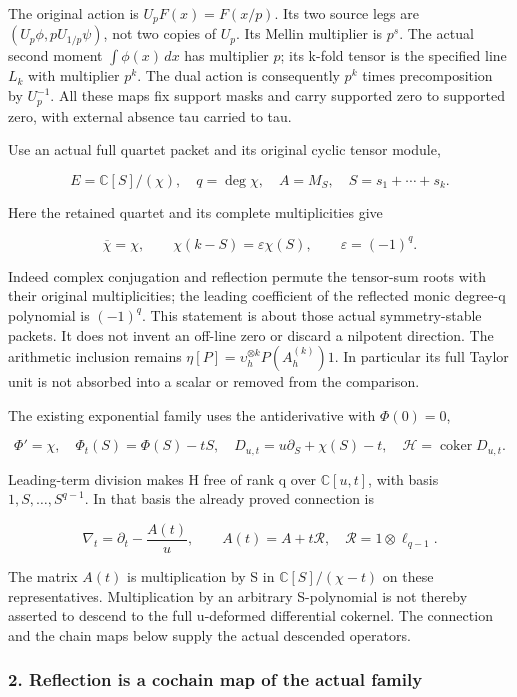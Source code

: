 \documentclass{article}
\begin{document}
The original action is \(U_p F(x)=F(x/p)\). Its two source legs are \((U_p\phi,pU_{1/p}\psi)\), not two copies of \(U_p\). Its Mellin multiplier is \(p^s\). The actual second moment \(\int\phi(x)\,dx\) has multiplier \(p\); its k-fold tensor is the specified line \(L_k\) with multiplier \(p^k\). The dual action is consequently \(p^k\) times precomposition by \(U_p^{-1}\). All these maps fix support masks and carry supported zero to supported zero, with external absence tau carried to tau.

Use an actual full quartet packet and its original cyclic tensor module,

\[
E=\mathbb C[S]/(\chi),\quad q=\deg\chi,\quad A=M_S,
\quad S=s_1+\cdots+s_k.
\tag{RW2}
\]

Here the retained quartet and its complete multiplicities give

\[
\overline\chi=\chi,\qquad
\chi(k-S)=\varepsilon\chi(S),\qquad\varepsilon=(-1)^q.
\tag{RW3}
\]

Indeed complex conjugation and reflection permute the tensor-sum roots with their original multiplicities; the leading coefficient of the reflected monic degree-q polynomial is \((-1)^q\). This statement is about those actual symmetry-stable packets. It does not invent an off-line zero or discard a nilpotent direction. The arithmetic inclusion remains \(\eta[P]=\upsilon_h^{\otimes k}P(A_h^{(k)})1\). In particular its full Taylor unit is not absorbed into a scalar or removed from the comparison.

The existing exponential family uses the antiderivative with \(\Phi(0)=0\),

\[
\Phi'=\chi,\quad\Phi_t(S)=\Phi(S)-tS,\quad
D_{u,t}=u\partial_S+\chi(S)-t,
\quad\mathcal H=\operatorname{coker}D_{u,t}.
\tag{RW4}
\]

Leading-term division makes H free of rank q over \(\mathbb C[u,t]\), with basis \(1,S,\ldots,S^{q-1}\). In that basis the already proved connection is

\[
\nabla_t=\partial_t-\frac{A(t)}u,\qquad
A(t)=A+t\mathcal R,
\quad\mathcal R=1\otimes\ell_{q-1}.
\tag{RW5}
\]

The matrix \(A(t)\) is multiplication by S in \(\mathbb C[S]/(\chi-t)\) on these representatives. Multiplication by an arbitrary S-polynomial is not thereby asserted to descend to the full u-deformed differential cokernel. The connection and the chain maps below supply the actual descended operators.

\subsubsection{2. Reflection is a cochain map of the actual family}\label{endpoint-f1_reflection--reflection-is-a-cochain-map-of-the-actual-family}
\end{document}
